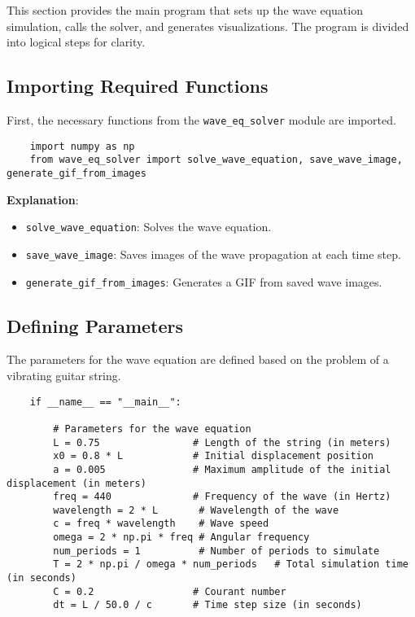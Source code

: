 \documentclass[a4paper, 11pt]{article}
\begin{document}
This section provides the main program that sets up the wave equation simulation, calls the solver, and generates visualizations. The program is divided into logical steps for clarity.

\subsection{Importing Required Functions}

First, the necessary functions from the \texttt{wave\_eq\_solver} module are imported.

\lstset{language=Python}
\begin{lstlisting}
	import numpy as np
	from wave_eq_solver import solve_wave_equation, save_wave_image, generate_gif_from_images
\end{lstlisting}

\textbf{Explanation}:
\begin{itemize}
	\item \texttt{solve\_wave\_equation}: Solves the wave equation.
	\item \texttt{save\_wave\_image}: Saves images of the wave propagation at each time step.
	\item \texttt{generate\_gif\_from\_images}: Generates a GIF from saved wave images.
\end{itemize}

\subsection{Defining Parameters}

The parameters for the wave equation are defined based on the problem of a vibrating guitar string.

\lstset{language=Python}
\begin{lstlisting}
	if __name__ == "__main__":
	
		# Parameters for the wave equation
		L = 0.75                # Length of the string (in meters)
		x0 = 0.8 * L            # Initial displacement position
		a = 0.005               # Maximum amplitude of the initial displacement (in meters)
		freq = 440              # Frequency of the wave (in Hertz)
		wavelength = 2 * L       # Wavelength of the wave
		c = freq * wavelength    # Wave speed
		omega = 2 * np.pi * freq # Angular frequency
		num_periods = 1          # Number of periods to simulate
		T = 2 * np.pi / omega * num_periods   # Total simulation time (in seconds)
		C = 0.2                 # Courant number
		dt = L / 50.0 / c       # Time step size (in seconds)
\end{lstlisting}
\end{document}
